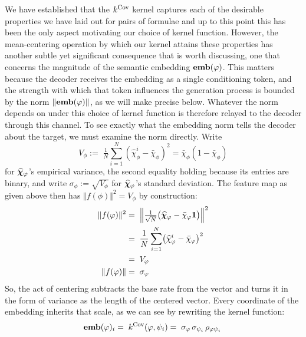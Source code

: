 \documentclass[titlepage,a4paper,11pt]{report}
\begin{document}
    We have established that the $k^{\mathrm{Cov}}$ kernel captures each of the desirable properties we have laid out for pairs of formulae and up to this point this has been the only aspect motivating our choice of kernel function. However, the mean-centering operation by which our kernel attains these properties has another subtle yet significant consequence that is worth discussing, one that concerns the magnitude of the semantic embedding $\textbf{emb}(\varphi)$. This matters because the decoder receives the embedding as a single conditioning token, and the strength with which that token influences the generation process is bounded by the norm $\Vert\textbf{emb}(\varphi)\Vert$, as we will make precise below. Whatever the norm depends on under this choice of kernel function is therefore relayed to the decoder through this channel. To see exactly what the embedding norm tells the decoder about the target, we must examine the norm directly. Write 
    \begin{equation}
        V_\phi :=\; \tfrac{1}{N}\sum_{i=1}^{N}(\widehat\chi^i_\phi - \bar\chi_\phi)^2 = \bar\chi_\phi(1-\bar\chi_\phi)
    \end{equation}
    for $\bm{\widehat\chi}_\varphi$'s empirical variance, the second equality holding because its entries are binary, and write $\sigma_\phi := \sqrt{V_\phi}$ for $\bm{\widehat\chi}_\varphi$'s standard deviation. The feature map as given above then has $\Vert f(\phi)\Vert^2 = V_\phi$ by construction: 
    \begin{equation}\label{eq:feature_map_norm}
    \begin{split}
    \Vert f(\varphi)\Vert^2    & =\; \Bigl\Vert \tfrac{1}{\sqrt N}\bigl(\bm{\widehat\chi}_\varphi - \bar\chi_\varphi\mathbf{1}\bigr)\Bigr\Vert^2 \\
                            & =\; \frac{1}{N}\sum_{i=1}^{N}\bigl(\widehat\chi^i_\varphi - \bar\chi_\varphi\bigr)^2 \\
                            & =\; V_\varphi \\
    \Vert f(\varphi)\Vert      & =\; \sigma_\varphi
    \end{split}
    \end{equation}
    So, the act of centering subtracts the base rate from the vector and turns it in the form of variance as the length of the centered vector. Every coordinate of the embedding inherits that scale, as we can see by rewriting the kernel function:
    \begin{equation}\label{eq:emb_coordinate}
    \textbf{emb}(\varphi)_i =\; k^{\mathrm{Cov}}(\varphi, \psi_i) =\; \sigma_\varphi\, \sigma_{\psi_i}\, \rho_{\varphi\psi_i}\,
    \end{equation}
\end{document}
